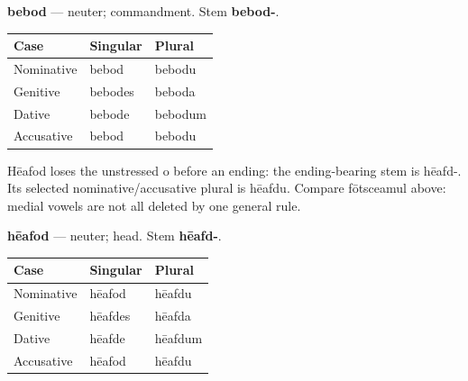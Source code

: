 \textbf{bebod} — neuter; commandment. Stem \textbf{bebod-}.

\par\begingroup
\fontsize{10.5}{13.2}\selectfont
\setlength{\LTleft}{0pt}\setlength{\LTright}{\fill}
\noindent
\begin{tabular}{@{}>{\raggedright\arraybackslash}p{39.46mm}>{\raggedright\arraybackslash}p{39.46mm}>{\raggedright\arraybackslash}p{39.46mm}@{}}
\toprule
\textbf{Case} & \textbf{Singular} & \textbf{Plural} \\
\midrule
Nominative & bebod & bebodu \\
Genitive & bebodes & beboda \\
Dative & bebode & bebodum \\
Accusative & bebod & bebodu \\
\bottomrule
\end{tabular}
\par\endgroup

Hēafod loses the unstressed o before an ending: the ending-bearing stem is hēafd-. Its selected nominative/\allowbreak{}accusative plural is hēafdu. Compare fōtsceamul above: medial vowels are not all deleted by one general rule.

\textbf{hēafod} — neuter; head. Stem \textbf{hēafd-}.

\par\begingroup
\fontsize{10.5}{13.2}\selectfont
\setlength{\LTleft}{0pt}\setlength{\LTright}{\fill}
\noindent
\begin{tabular}{@{}>{\raggedright\arraybackslash}p{39.46mm}>{\raggedright\arraybackslash}p{39.46mm}>{\raggedright\arraybackslash}p{39.46mm}@{}}
\toprule
\textbf{Case} & \textbf{Singular} & \textbf{Plural} \\
\midrule
Nominative & hēafod & hēafdu \\
Genitive & hēafdes & hēafda \\
Dative & hēafde & hēafdum \\
Accusative & hēafod & hēafdu \\
\bottomrule
\end{tabular}
\par\endgroup

